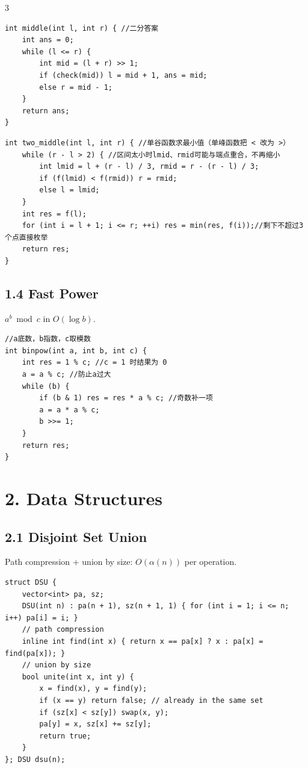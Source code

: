 \documentclass[8pt]{extarticle}
\begin{document}
\begin{multicols*}{3}
\begin{lstlisting}
int middle(int l, int r) { //二分答案
    int ans = 0;
    while (l <= r) {
        int mid = (l + r) >> 1;
        if (check(mid)) l = mid + 1, ans = mid;
        else r = mid - 1;
    }
    return ans;
}
\end{lstlisting}

\begin{lstlisting}
int two_middle(int l, int r) { //单谷函数求最小值（单峰函数把 < 改为 >）
    while (r - l > 2) { //区间太小时lmid、rmid可能与端点重合，不再缩小
        int lmid = l + (r - l) / 3, rmid = r - (r - l) / 3;
        if (f(lmid) < f(rmid)) r = rmid;
        else l = lmid;
    }
    int res = f(l);
    for (int i = l + 1; i <= r; ++i) res = min(res, f(i));//剩下不超过3个点直接枚举
    return res;
}
\end{lstlisting}

\subsection*{1.4 Fast Power}

$a^b \bmod c$ in $O(\log b)$.


\begin{lstlisting}
//a底数，b指数，c取模数
int binpow(int a, int b, int c) {
    int res = 1 % c; //c = 1 时结果为 0
    a = a % c; //防止a过大
    while (b) {
        if (b & 1) res = res * a % c; //奇数补一项
        a = a * a % c;
        b >>= 1;
    }
    return res;
}
\end{lstlisting}

\section*{2. Data Structures}

\subsection*{2.1 Disjoint Set Union}

Path compression + union by size: $O(\alpha(n))$ per operation.


\begin{lstlisting}
struct DSU {
    vector<int> pa, sz;
    DSU(int n) : pa(n + 1), sz(n + 1, 1) { for (int i = 1; i <= n; i++) pa[i] = i; }
    // path compression
    inline int find(int x) { return x == pa[x] ? x : pa[x] = find(pa[x]); }
    // union by size
    bool unite(int x, int y) {
        x = find(x), y = find(y);
        if (x == y) return false; // already in the same set
        if (sz[x] < sz[y]) swap(x, y);
        pa[y] = x, sz[x] += sz[y];
        return true;
    }
}; DSU dsu(n);
\end{lstlisting}


\end{multicols*}
\end{document}
